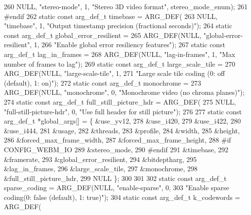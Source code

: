 \begin{DoxyCodeInclude}
{{260     NULL, \textcolor{stringliteral}{"stereo-mode"}, 1, \textcolor{stringliteral}{"Stereo 3D video format"}, stereo\_mode\_enum);
261 \textcolor{preprocessor}{#endif}
262 \textcolor{keyword}{static} \textcolor{keyword}{const} arg\_def\_t timebase = ARG\_DEF(
263     NULL, \textcolor{stringliteral}{"timebase"}, 1, \textcolor{stringliteral}{"Output timestamp precision (fractional seconds)"});
264 \textcolor{keyword}{static} \textcolor{keyword}{const} arg\_def\_t global\_error\_resilient =
265     ARG\_DEF(NULL, \textcolor{stringliteral}{"global-error-resilient"}, 1,
266         \textcolor{stringliteral}{"Enable global error resiliency features"});
267 \textcolor{keyword}{static} \textcolor{keyword}{const} arg\_def\_t lag\_in\_frames =
268     ARG\_DEF(NULL, \textcolor{stringliteral}{"lag-in-frames"}, 1, \textcolor{stringliteral}{"Max number of frames to lag"});
269 \textcolor{keyword}{static} \textcolor{keyword}{const} arg\_def\_t large\_scale\_tile =
270     ARG\_DEF(NULL, \textcolor{stringliteral}{"large-scale-tile"}, 1,
271         \textcolor{stringliteral}{"Large scale tile coding (0: off (default), 1: on)"});
272 \textcolor{keyword}{static} \textcolor{keyword}{const} arg\_def\_t monochrome =
273     ARG\_DEF(NULL, \textcolor{stringliteral}{"monochrome"}, 0, \textcolor{stringliteral}{"Monochrome video (no chroma planes)"});
274 \textcolor{keyword}{static} \textcolor{keyword}{const} arg\_def\_t full\_still\_picture\_hdr = ARG\_DEF(
275     NULL, \textcolor{stringliteral}{"full-still-picture-hdr"}, 0, \textcolor{stringliteral}{"Use full header for still picture"});
276 
277 \textcolor{keyword}{static} \textcolor{keyword}{const} arg\_def\_t *global\_args[] = \{ &use\_yv12,
278     &use\_i420,
279     &use\_i422,
280     &use\_i444,
281     &usage,
282     &threads,
283     &profile,
284     &width,
285     &height,
286     &forced\_max\_frame\_width,
287     &forced\_max\_frame\_height,
288 \textcolor{preprocessor}{#if CONFIG\_WEBM\_IO}
289     &stereo\_mode,
290 \textcolor{preprocessor}{#endif}
291     &timebase,
292     &framerate,
293     &global\_error\_resilient,
294     &bitdeptharg,
295     &lag\_in\_frames,
296     &large\_scale\_tile,
297     &monochrome,
298     &full\_still\_picture\_hdr,
299     NULL \};
300 
301 
302 \textcolor{keyword}{static} \textcolor{keyword}{const} arg\_def\_t sparse\_coding = ARG\_DEF(NULL, \textcolor{stringliteral}{"enable-sparse"}, 0,
303     \textcolor{stringliteral}{"Enable sparse coding(0: false (default), 1: true)"});
304 \textcolor{keyword}{static} \textcolor{keyword}{const} arg\_def\_t k\_codewords = ARG\_DEF(
}}
\end{DoxyCodeInclude}
